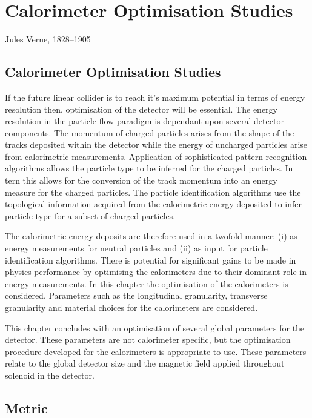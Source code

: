 \chapter{Calorimeter Optimisation Studies}
\label{chap:detopt}

{Jules Verne, 1828--1905}

\section{Calorimeter Optimisation Studies}
If the future linear collider is to reach it's maximum potential in terms of energy resolution then, optimisation of the detector will be essential.  The energy resolution in the particle flow paradigm is dependant upon several detector components.  The momentum of charged particles arises from the shape of the tracks deposited within the detector while the energy of uncharged particles arise from calorimetric measurements.  Application of sophisticated pattern recognition algorithms allows the particle type to be inferred for the charged particles.  In tern this allows for the conversion of the track momentum into an energy measure for the charged particles.  The particle identification algorithms use the topological information acquired from the calorimetric energy deposited to infer particle type for a subset of charged particles.  

The calorimetric energy deposits are therefore used in a twofold manner: (i) as energy measurements for neutral particles and (ii) as input for particle identification algorithms.  There is potential for significant gains to be made in physics performance by optimising the calorimeters due to their dominant role in energy measurements.  In this chapter the optimisation of the calorimeters is considered.  Parameters such as the longitudinal granularity, transverse granularity and material choices for the calorimeters are considered.  

This chapter concludes with an optimisation of several global parameters for the detector.  These parameters are not calorimeter specific, but the optimisation procedure developed for the calorimeters is appropriate to use.  These parameters relate to the global detector size and the magnetic field applied throughout solenoid in the detector.

\section{Metric}


